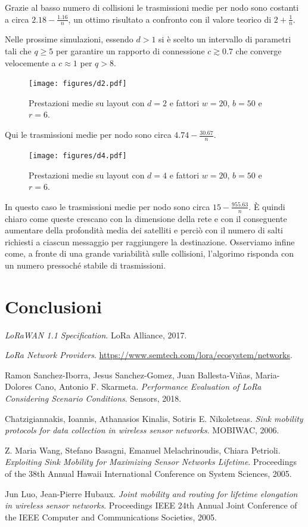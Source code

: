 \documentclass[a4paper,12pt]{article}
\theoremstyle{definition}
\begin{document}
Grazie al basso numero di collisioni le trasmissioni medie per nodo sono costanti a circa $2.18 - \frac{1.16}{n}$, un ottimo risultato a confronto con il valore teorico di $2 + \frac{1}{n}$.

Nelle prossime simulazioni, essendo $d>1$ si è scelto un intervallo di parametri tali che $q \geq 5$ per garantire un rapporto di connessione $c \gtrsim 0.7$ che converge velocemente a $c \approx 1$ per $q > 8$.

\begin{figure}[H]
\centering
\texttt{[image: figures/d2.pdf]}
\caption{Prestazioni medie su layout con $d=2$ e fattori $w=20$, $b=50$ e $r=6$.}
\end{figure}

Qui le trasmissioni medie per nodo sono circa $4.74 - \frac{30.67}{n}$.

\begin{figure}[H]
\centering
\texttt{[image: figures/d4.pdf]}
\caption{Prestazioni medie su layout con $d=4$ e fattori $w=20$, $b=50$ e $r=6$.}
\end{figure}

In questo caso le trasmissioni medie per nodo sono circa $15 - \frac{955.63}{n}$. È quindi chiaro come queste crescano con la dimensione della rete e con il conseguente aumentare della profondità media dei satelliti e perciò con il numero di salti richiesti a ciascun messaggio per raggiungere la destinazione. Osserviamo infine come, a fronte di una grande variabilità sulle collisioni, l'algorimo risponda con un numero pressoché stabile di trasmissioni.

\section{Conclusioni}

\begin{thebibliography}{0}

\textit{LoRaWAN 1.1 Specification}.
LoRa Alliance, 2017.

\textit{LoRa Network Providers}.
\url{https://www.semtech.com/lora/ecosystem/networks}.

Ramon Sanchez-Iborra, Jesus Sanchez-Gomez, Juan Ballesta-Viñas, Maria-Dolores Cano, Antonio F. Skarmeta.
\textit{Performance Evaluation of LoRa Considering Scenario Conditions}. 
Sensors, 2018.

Chatzigiannakis, Ioannis, Athanasios Kinalis, Sotiris E. Nikoletseas.
\textit{Sink mobility protocols for data collection in wireless sensor networks}.
MOBIWAC, 2006.

Z. Maria Wang, Stefano Basagni, Emanuel Melachrinoudis, Chiara Petrioli.
\textit{Exploiting Sink Mobility for Maximizing Sensor Networks Lifetime}.
Proceedings of the 38th Annual Hawaii International Conference on System Sciences, 2005.

Jun Luo, Jean-Pierre Hubaux.
\textit{Joint mobility and routing for lifetime elongation in wireless sensor networks}.
Proceedings IEEE 24th Annual Joint Conference of the IEEE Computer and Communications Societies, 2005.

\end{thebibliography}
\end{document}
